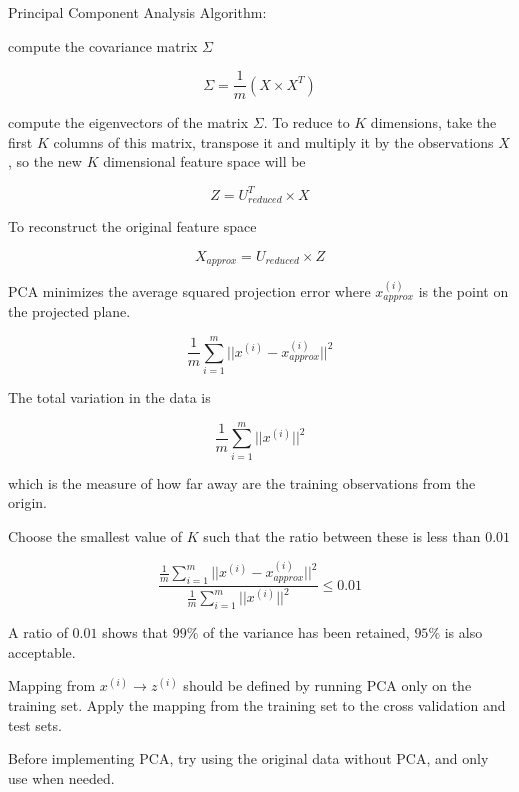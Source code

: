 \documentclass[
]{article}
\begin{document}
Principal Component Analysis Algorithm:

compute the covariance matrix \(\Sigma\)

\[\Sigma = \frac{1}{m}(X\times X^T)\]

compute the eigenvectors of the matrix \(\Sigma\). To reduce to \(K\)
dimensions, take the first \(K\) columns of this matrix, transpose it
and multiply it by the observations \(X\), so the new \(K\) dimensional
feature space will be

\[Z= U_{reduced}^T \times X\]

To reconstruct the original feature space

\[X_{approx} = U_{reduced} \times Z\]

PCA minimizes the average squared projection error where
\(x^{(i)}_{approx}\) is the point on the projected plane.

\[\frac{1}{m}\sum^m_{i=1}||x^{(i)}-x^{(i)}_{approx}||^2\]

The total variation in the data is

\[\frac{1}{m}\sum^m_{i=1}||x^{(i)}||^2\]

which is the measure of how far away are the training observations from
the origin.

Choose the smallest value of \(K\) such that the ratio between these is
less than \(0.01\)

\[{\frac{\frac{1}{m}\sum^m_{i=1}||x^{(i)}-x^{(i)}_{approx}||^2}{\frac{1}{m}\sum^m_{i=1}||x^{(i)}||^2}} \le 0.01\]

A ratio of \(0.01\) shows that \(99\%\) of the variance has been
retained, \(95\%\) is also acceptable.

Mapping from \(x^{(i)} \rightarrow z^{(i)}\) should be defined by
running PCA only on the training set. Apply the mapping from the
training set to the cross validation and test sets.

Before implementing PCA, try using the original data without PCA, and
only use when needed.
\end{document}
